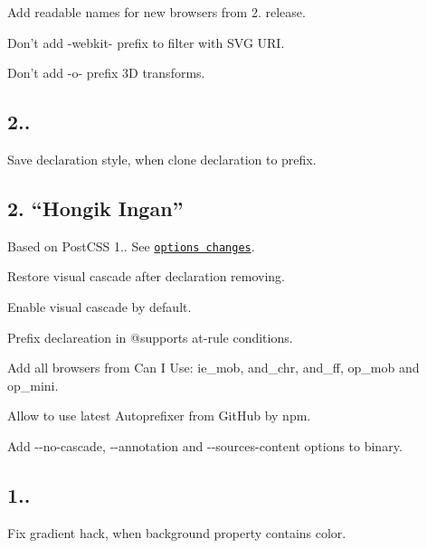 \begin{DoxyItemize}
\item Add readable names for new browsers from 2. release.
\item Don’t add {\ttfamily -\/webkit-\/} prefix to {\ttfamily filter} with S\+VG U\+RI.
\item Don’t add {\ttfamily -\/o-\/} prefix 3D transforms.
\end{DoxyItemize}

\subsection*{2..}


\begin{DoxyItemize}
\item Save declaration style, when clone declaration to prefix.
\end{DoxyItemize}

\subsection*{2. “\+Hongik Ingan”}


\begin{DoxyItemize}
\item Based on Post\+C\+SS 1.. See \href{https://github.com/postcss/postcss/releases/tag/1.0.0}{\tt options changes}.
\item Restore visual cascade after declaration removing.
\item Enable visual cascade by default.
\item Prefix declareation in {\ttfamily @supports} at-\/rule conditions.
\item Add all browsers from Can I Use\+: {\ttfamily ie\+\_\+mob}, {\ttfamily and\+\_\+chr}, {\ttfamily and\+\_\+ff}, {\ttfamily op\+\_\+mob} and {\ttfamily op\+\_\+mini}.
\item Allow to use latest Autoprefixer from Git\+Hub by npm.
\item Add {\ttfamily -\/-\/no-\/cascade}, {\ttfamily -\/-\/annotation} and {\ttfamily -\/-\/sources-\/content} options to binary.
\end{DoxyItemize}

\subsection*{1..}


\begin{DoxyItemize}
\item Fix gradient hack, when {\ttfamily background} property contains color.
\end{DoxyItemize}

